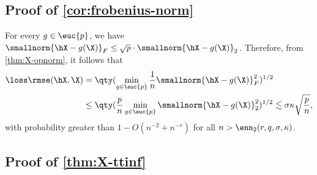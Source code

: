 \documentclass[10pt]{article}
\begin{document}
\subsection{Proof of \cref{cor:frobenius-norm}}
\label{proof:cor:frobenius-norm}

For every $g \in \euc{p}$, we have $\smallnorm{\hX - g(\X)}_F \le \sqrt{p} \cdot \smallnorm{\hX - g(\X)}_2$. Therefore, from \cref{thm:X-opnorm}, it follows that
\begin{align}
    \loss\rmse(\hX, \X) 
    &= \qty(\min_{g \in \euc{p}}\frac{1}{n}\smallnorm{\hX - g(\X)}^2_F)^{1/2}\\ 
    &\le \qty(\frac{p}{n}\min_{g \in \euc{p}}\smallnorm{\hX - g(\X)}^2_2)^{1/2} \lesssim \sigma\kappa\sqrt{\frac{p}{n}},\label{eq:precise-frobenius-norm}
\end{align}
with probability greater than $1 - O(n^{-2} + n^{-r})$ for all $n > \enn_2(r, q, \sigma, \kappa)$.
\QED

































































\subsection{Proof of \cref{thm:X-ttinf}}
\label{proof:thm:X-ttinf}
\end{document}
